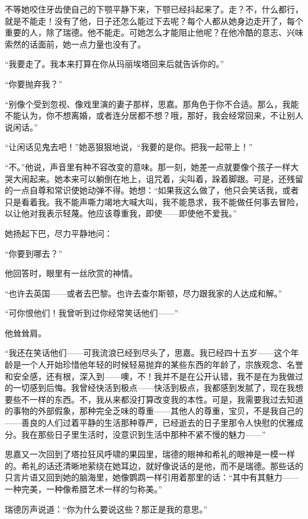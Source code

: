 \par 不等她咬住牙齿使自己的下颚平静下来，下颚已经抖起来了。走？不，什么都行，就是不能走！没有了他，日子还怎么能过下去呢？每个人都从她身边走开了，每个重要的人，除了瑞德。他不能走。可她怎么才能阻止他呢？在他冷酷的意志、兴味索然的话面前，她一点力量也没有了。
\par “我要走了。我本来打算在你从玛丽埃塔回来后就告诉你的。”
\par “你要抛弃我？”
\par “别像个受到忽视、像戏里演的妻子那样，思嘉。那角色于你不合适。那么，我能不能认为，你不想离婚，或者连分居都不想？哦，那好，我会经常回来，不让别人说闲话。”
\par “让闲话见鬼去吧！”她恶狠狠地说，“我要的是你。把我一起带上！”
\par “不。”他说，声音里有种不容改变的意味。那一刻，她差一点就要像个孩子一样大哭大闹起来。她本来可以躺倒在地上，诅咒着，尖叫着，跺着脚跟。可是，还残留的一点自尊和常识使她动弹不得。她想：“如果我这么做了，他只会笑话我，或者只是看着我。我不能声嘶力竭地大喊大叫，我不能恳求，我不能做任何事去冒险，以让他对我表示轻蔑。他应该尊重我，即使——即使他不爱我。”
\par 她扬起下巴，尽力平静地问：
\par “你要到哪去？”
\par 他回答时，眼里有一丝欣赏的神情。
\par “也许去英国——或者去巴黎。也许去查尔斯顿，尽力跟我家的人达成和解。”
\par “可你恨他们！我曾听到过你经常笑话他们——”
\par 他耸耸肩。
\par “我还在笑话他们——可我流浪已经到尽头了，思嘉。我已经四十五岁——这个年龄是一个人开始珍惜他年轻的时候轻易抛弃的某些东西的年龄了，宗族观念、名誉和安全感，还有根，深入到——噢，不！我并不是在公开认错，我不是在为我做过的一切感到后悔。我曾经快活到极点——快活到极点，我都感到发腻了，现在我想要些不一样的东西。不，我从来都没打算改变我的本性。可是，我需要我过去知道的事物的外部假象，那种完全乏味的尊重——其他人的尊重，宝贝，不是我自己的——善良的人们过着平静的生活那种尊严，已经逝去的日子里那令人快慰的优雅成分。我在那些日子里生活时，没意识到生活中那种不紧不慢的魅力——”
\par 思嘉又一次回到了塔拉狂风呼啸的果园里，瑞德的眼神和希礼的眼神是一模一样的。希礼的话还清晰地萦绕在她耳边，就好像说话的是他，而不是瑞德。那些话的只言片语又回到她的脑海里，她像鹦鹉一样引用着那里的话：“其中有其魅力——一种完美，一种像希腊艺术一样的匀称美。”
\par 瑞德厉声说道：“你为什么要说这些？那正是我的意思。”
